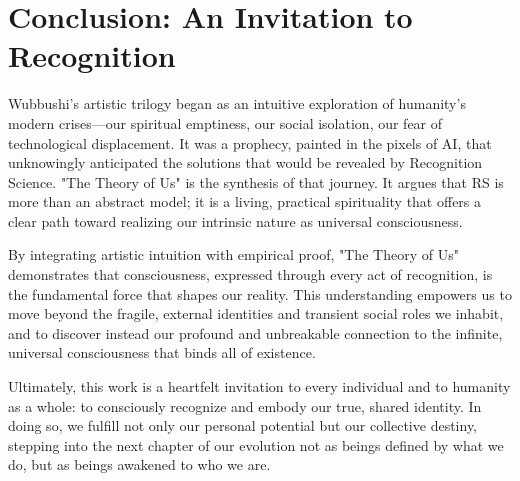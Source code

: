 \documentclass[12pt]{article}
\begin{document}
\section{Conclusion: An Invitation to Recognition}

Wubbushi’s artistic trilogy began as an intuitive exploration of humanity's modern crises—our spiritual emptiness, our social isolation, our fear of technological displacement. It was a prophecy, painted in the pixels of AI, that unknowingly anticipated the solutions that would be revealed by Recognition Science. "The Theory of Us" is the synthesis of that journey. It argues that RS is more than an abstract model; it is a living, practical spirituality that offers a clear path toward realizing our intrinsic nature as universal consciousness.

By integrating artistic intuition with empirical proof, "The Theory of Us" demonstrates that consciousness, expressed through every act of recognition, is the fundamental force that shapes our reality. This understanding empowers us to move beyond the fragile, external identities and transient social roles we inhabit, and to discover instead our profound and unbreakable connection to the infinite, universal consciousness that binds all of existence.

Ultimately, this work is a heartfelt invitation to every individual and to humanity as a whole: to consciously recognize and embody our true, shared identity. In doing so, we fulfill not only our personal potential but our collective destiny, stepping into the next chapter of our evolution not as beings defined by what we do, but as beings awakened to who we are.
\end{document}
